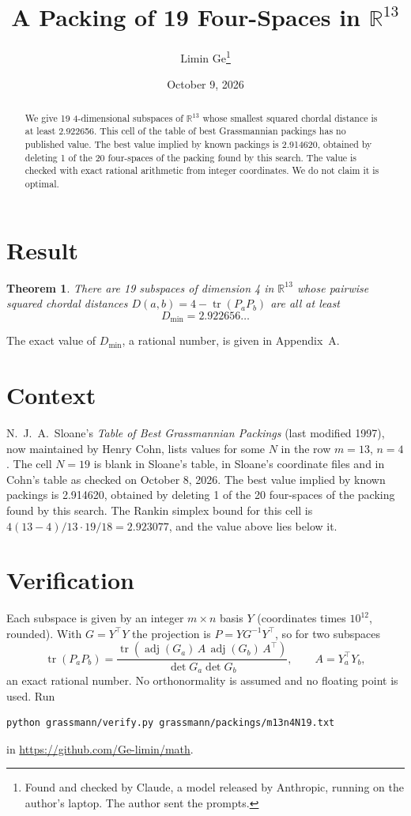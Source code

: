 \documentclass[11pt,a4paper]{article}
\title{A Packing of 19 Four-Spaces in $\mathbb{R}^{13}$}
\author{Limin Ge\thanks{Found and checked by Claude, a model released by Anthropic, running on the author's laptop. The author sent the prompts.}}
\date{October 9, 2026}
\newtheorem*{theorem}{Theorem}
\begin{document}
\maketitle
\begin{abstract}
We give 19 4-dimensional subspaces of $\mathbb{R}^{13}$ whose smallest squared chordal distance is at least 2.922656. This cell of the table of best Grassmannian packings has no published value. The best value implied by known packings is 2.914620, obtained by deleting 1 of the 20 four-spaces of the packing found by this search. The value is checked with exact rational arithmetic from integer coordinates. We do not claim it is optimal.
\end{abstract}

\section{Result}
\begin{theorem}
There are 19 subspaces of dimension 4 in $\mathbb{R}^{13}$ whose pairwise squared chordal distances $D(a,b) = 4 - \operatorname{tr}(P_aP_b)$ are all at least
\[ D_{\min} = 2.922656\ldots \]
\end{theorem}
The exact value of $D_{\min}$, a rational number, is given in Appendix~A.


\section{Context}
N.~J.~A.~Sloane's \emph{Table of Best Grassmannian Packings} (last modified 1997), now maintained by Henry Cohn, lists values for some $N$ in the row $m=13$, $n=4$. The cell $N=19$ is blank in Sloane's table, in Sloane's coordinate files and in Cohn's table as checked on October 8, 2026. The best value implied by known packings is 2.914620, obtained by deleting 1 of the 20 four-spaces of the packing found by this search. The Rankin simplex bound for this cell is $4(13-4)/13\cdot 19/18 = 2.923077$, and the value above lies below it.


\section{Verification}
Each subspace is given by an integer $m\times n$ basis $Y$ (coordinates times $10^{12}$, rounded). With $G=Y^\top Y$ the projection is $P=YG^{-1}Y^\top$, so for two subspaces
\[ \operatorname{tr}(P_aP_b)=\frac{\operatorname{tr}(\operatorname{adj}(G_a)\,A\,\operatorname{adj}(G_b)\,A^\top)}{\det G_a\det G_b},\qquad A=Y_a^\top Y_b, \]
an exact rational number. No orthonormality is assumed and no floating point is used. Run
\begin{verbatim}
python grassmann/verify.py grassmann/packings/m13n4N19.txt
\end{verbatim}
in \url{https://github.com/Ge-limin/math}.
\end{document}
